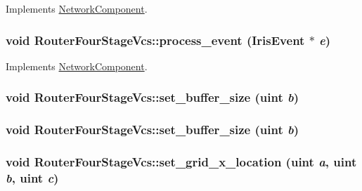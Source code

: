 Implements \hyperlink{classNetworkComponent_c93793eea1e2d424abe86e110ca8b399}{NetworkComponent}.\hypertarget{classRouterFourStageVcs_81562fa747c216e200476ab1f85699bf}{
\subsubsection[{process\_\-event}]{\setlength{\rightskip}{0pt plus 5cm}void RouterFourStageVcs::process\_\-event ({\bf IrisEvent} $\ast$ {\em e})}}
\label{classRouterFourStageVcs_81562fa747c216e200476ab1f85699bf}




Implements \hyperlink{classNetworkComponent_c93793eea1e2d424abe86e110ca8b399}{NetworkComponent}.\hypertarget{classRouterFourStageVcs_94759bddc4770f0ce40545682606847a}{
\subsubsection[{set\_\-buffer\_\-size}]{\setlength{\rightskip}{0pt plus 5cm}void RouterFourStageVcs::set\_\-buffer\_\-size ({\bf uint} {\em b})}}
\label{classRouterFourStageVcs_94759bddc4770f0ce40545682606847a}


\hypertarget{classRouterFourStageVcs_94759bddc4770f0ce40545682606847a}{
\subsubsection[{set\_\-buffer\_\-size}]{\setlength{\rightskip}{0pt plus 5cm}void RouterFourStageVcs::set\_\-buffer\_\-size ({\bf uint} {\em b})}}
\label{classRouterFourStageVcs_94759bddc4770f0ce40545682606847a}


\hypertarget{classRouterFourStageVcs_c11828571c463389fd410cd4e80768fb}{
\subsubsection[{set\_\-grid\_\-x\_\-location}]{\setlength{\rightskip}{0pt plus 5cm}void RouterFourStageVcs::set\_\-grid\_\-x\_\-location ({\bf uint} {\em a}, \/  {\bf uint} {\em b}, \/  {\bf uint} {\em c})}}
\label{classRouterFourStageVcs_c11828571c463389fd410cd4e80768fb}


